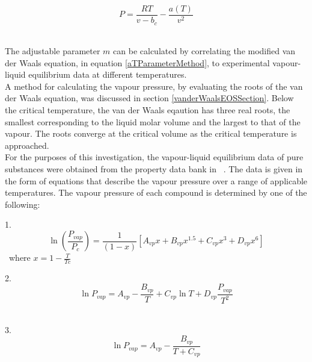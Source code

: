 \begin{equation}
P  = \dfrac{RT}{v - b_{c}} - \dfrac{a\left(T\right)}{v^{2}} \label{vdWaalsModifiedMethod}
\end{equation}\

The adjustable parameter $m$ can be calculated by correlating the modified van der Waals equation, in equation \ref{aTParameterMethod}, to experimental vapour-liquid equilibrium data at different temperatures.\\

A method for calculating the vapour pressure, by evaluating the roots of the van der Waals equation, was discussed in section \ref{vanderWaalsEOSSection}. Below the critical temperature, the van der Waals eqaution has three real roots, the smallest corresponding to the liquid molar volume and the largest to that of the vapour. The roots converge at the critical volume as the critical temperature is approached.\\

For the purposes of this investigation, the vapour-liquid equilibrium data of pure substances were obtained from the property data bank in \citeauthor{GasLiquidProperties}~\cite{GasLiquidProperties}. The data is given in the form of equations that describe the vapour pressure over a range of applicable temperatures. The vapour pressure of each compound is determined by one of the following:\

\begin{list}{method}{}
\item 1. \begin{equation}
\ln \left(\frac{P_{vap}}{P_{c}}\right) = \frac{1}{\left(1-x\right)}\left[A_{vp}x + B_{vp}x^{1.5} + C_{vp}x^{3} + D_{vp}x^{6}\right] \label{Method1}
\end{equation}\
where $x = 1 - \frac{T}{Tc}$\
\item 2. \begin{equation}
\ln P_{vap} = A_{vp} - \frac{B_{vp}}{T} + C_{vp}\ln T + D_{vp} \frac{P_{vap}}{T^{2}} \label{Method2}
\end{equation}\
\item 3. \begin{equation}
\ln P_{vap} = A_{vp} - \frac{B_{vp}}{T + C_{vp}} \label{Method3}
\end{equation}\
\end{list}\
				
\nomenclature{$P_{vap}$}{Vapour pressure of a pure compound $[bar]$}
		
